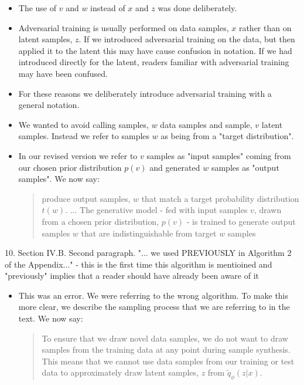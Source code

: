 \documentclass{article}
\begin{document}
\begin{itemize}
    \item The use of $v$ and $w$ instead of $x$ and $z$ was done deliberately.
    \item Adversarial training is usually performed on data samples, $x$ rather than on latent samples, $z$. If we introduced adversarial training on the data, but then applied it to the latent this may have cause confusion in notation. If we had introduced directly for the latent, readers familiar with adversarial training may have been confused. 
    \item For these reasons we deliberately introduce adversarial training with a general notation. 
    \item We wanted to avoid calling samples, $w$ data samples and sample, $v$ latent samples. Instead we refer to samples $w$ as being from a "target distribution".
    \item In our revised version we refer to $v$ samples as "input samples" coming from our chosen prior distribution $p(v)$ and generated $w$ samples as "output samples". We now say:
    
    \begin{quote}
        produce output samples, $w$ that match a target probability distribution $t(w)$. \newline ... \newline
        The generative model - fed with input samples $v$, drawn from a chosen prior distribution, $p(v)$ - is trained to generate output samples $w$ that are indistinguishable from target $w$ samples  
    \end{quote}
\end{itemize}

{\color{blue}
10. Section IV.B. Second paragraph. "... we used PREVIOUSLY in Algorithm 2 of the Appendix..." - this is the first time this algorithm is mentioined and "previously" implies that a reader should have already been aware of it}
\begin{itemize}
    \item This was an error. We were referring to the wrong algorithm. To make this more clear, we describe the sampling process that we are referring to in the text. We now say:
    \begin{quote}
        To ensure that we draw novel data samples, we do not want to draw samples from the training data at any point during sample synthesis. This means that we cannot use data samples from our training or test data to approximately draw latent samples, $z$ from $\tilde{q}_\phi(z|x)$.
    \end{quote} 
\end{itemize}
\end{document}
